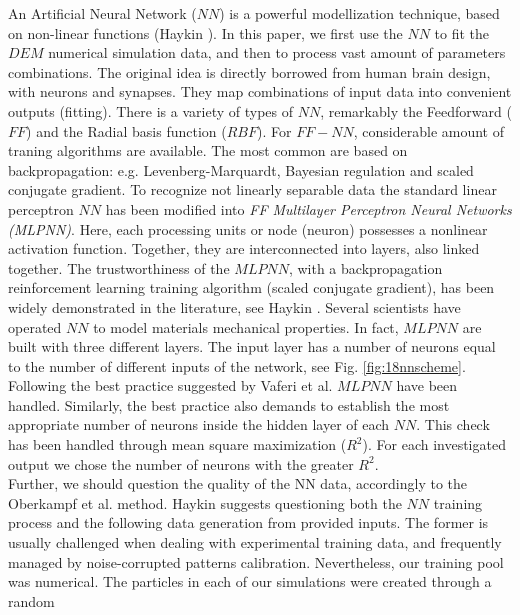 An Artificial Neural Network ($NN$) is a powerful modellization technique, 
based on non-linear functions (Haykin \cite{RefWorks:158}). 
In this paper, we first use the $NN$ to fit the $DEM$ numerical simulation data, 
and then to process vast amount of parameters combinations. 
The original idea is directly borrowed from human brain design, with neurons and synapses. 
They map combinations of input data into convenient outputs (fitting). 
There is a variety of types of $NN$, remarkably the Feedforward ($FF$) 
and the Radial basis function ($RBF$). For $FF-NN$, considerable amount 
of traning algorithms are available. The most common are based on backpropagation: 
e.g. Levenberg-Marquardt, Bayesian regulation and scaled conjugate gradient. 
To recognize not linearly separable data the standard linear perceptron $NN$ 
has been modified into \textit{FF Multilayer Perceptron Neural Networks (MLPNN)}. 
Here, each processing units or node (neuron) possesses a nonlinear activation function. 
Together, they are interconnected into layers, also linked together. 
The trustworthiness of the $MLPNN$, with a backpropagation reinforcement learning 
training algorithm (scaled conjugate gradient), has been widely demonstrated in the 
literature, see Haykin \cite{RefWorks:158}. Several scientists 
\cite{RefWorks:161, RefWorks:166, RefWorks:167, RefWorks:168, RefWorks:169, RefWorks:170} 
have operated $NN$ to model materials mechanical properties. 
In fact, $MLPNN$ are built with three different layers. 
%
The input layer has a number of neurons equal to the number of different inputs
of the network, see Fig. \ref{fig:18nnscheme}.
Following the best practice suggested by Vaferi et al. \cite{RefWorks:150} $MLPNN$ have been handled.
Similarly, the best practice also demands to establish the most appropriate number of neurons inside the 
hidden layer of each $NN$. This check has been handled through mean square maximization ($R^2$). 
For each investigated output we chose the number of neurons with the greater
$R^2$.\\
Further, we should question the quality of the NN data, accordingly to the 
Oberkampf et al. \cite{RefWorks:160} method. Haykin \cite{RefWorks:158} 
suggests questioning both the $NN$ training process and the following data
generation from provided inputs.
The former is usually challenged when dealing with experimental training data, and frequently 
managed by noise-corrupted patterns calibration. Nevertheless, our training pool
was numerical.
The particles in each of our simulations were created through a random
